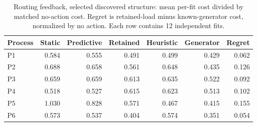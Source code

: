 \begin{table}[t]\caption{Routing feedback, selected discovered structure: mean per-fit cost divided by matched no-action cost. Regret is retained-load minus known-generator cost, normalized by no action. Each row contains 12 independent fits.}\label{tab:structures_results}\centering\small\setlength{\tabcolsep}{4pt}
\begin{tabular}{lrrrrrr}\toprule
Process & Static & Predictive & Retained & Heuristic & Generator & Regret\\\midrule
P1 & 0.584 & 0.555 & 0.491 & 0.499 & 0.429 & 0.062 \\
P2 & 0.688 & 0.658 & 0.561 & 0.648 & 0.435 & 0.126 \\
P3 & 0.659 & 0.659 & 0.613 & 0.635 & 0.522 & 0.092 \\
P4 & 0.518 & 0.527 & 0.615 & 0.623 & 0.513 & 0.102 \\
P5 & 1.030 & 0.828 & 0.571 & 0.467 & 0.415 & 0.155 \\
P6 & 0.573 & 0.537 & 0.404 & 0.574 & 0.351 & 0.054 \\
\bottomrule\end{tabular}\end{table}
